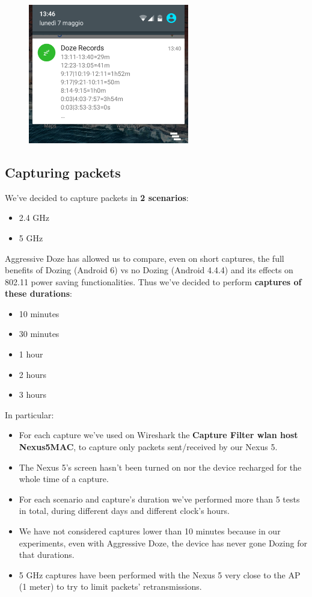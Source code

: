 \documentclass[11pt, a4paper]{article}
\begin{document}
	\begin{figure}[h]
        \includegraphics[width=7cm]{dozeRecs.png}
        \centering
    \end{figure}
	
	\subsection{Capturing packets}
	We've decided to capture packets in \textbf{2 scenarios}:
	\begin{itemize}
	    \item 2.4 GHz
	    \item 5 GHz
	\end{itemize}
	Aggressive Doze has allowed us to compare, even on short captures, the full benefits of Dozing (Android 6) vs no Dozing (Android 4.4.4) and its effects on 802.11 power saving functionalities. Thus we've decided to perform \textbf{captures of these durations}:
	   \begin{itemize}
	       \item 10 minutes
	       \item 30 minutes
	       \item 1 hour
	       \item 2 hours
	       \item 3 hours
	   \end{itemize}
	 In particular:
	 \begin{itemize}
	     \item For each capture we've used on Wireshark the \textbf{Capture Filter wlan host Nexus5MAC}, to capture only packets sent/received by our Nexus 5.
	     \item The Nexus 5's screen hasn't been turned on nor the device recharged for the whole time of a capture.
	     \item For each scenario and capture's duration we've performed more than 5 tests in total, during different days and different clock's hours.
	     \item We have not considered captures lower than 10 minutes because in our experiments, even with Aggressive Doze, the device has never gone Dozing for that durations.
	     \item 5 GHz captures have been performed with the Nexus 5 very close to the AP (1 meter) to try to limit packets' retransmissions.
	 \end{itemize}
	    
\end{document}
